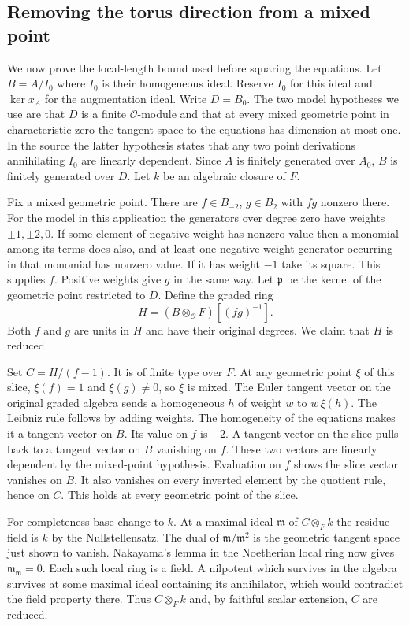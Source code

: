 \subsection{Removing the torus direction from a mixed point}

We now prove the local-length bound used before squaring the equations.
Let \(B=A/I_0\) where \(I_0\) is their homogeneous ideal. Reserve \(I_0\) for
this ideal and \(\ker x_A\) for the augmentation ideal. Write \(D=B_0\).
The two model hypotheses we use are that \(D\) is a finite
\(\mathcal O\)-module and that at every mixed geometric point in
characteristic zero the tangent space to the equations has dimension
at most one. In the source the latter hypothesis states that any
two point derivations annihilating \(I_0\) are linearly dependent.
Since \(A\) is finitely generated over \(A_0\), \(B\) is finitely
generated over \(D\). Let \(k\) be an algebraic closure of \(F\).

Fix a mixed geometric point. There are \(f\in B_{-2}\),
\(g\in B_2\) with \(fg\) nonzero there. For the model in this
application the generators over degree zero have weights
\(\pm1,\pm2,0\). If some element of negative weight has nonzero
value then a monomial among its terms does also, and at least one
negative-weight generator occurring in that monomial has nonzero
value. If it has weight \(-1\) take its square. This supplies \(f\). Positive weights give \(g\) in the same way. Let \(\mathfrak p\) be the kernel
of the geometric point restricted to \(D\). Define the graded ring
\[
     H=(B\otimes_{\mathcal O}F)[(fg)^{-1}] .
\]
Both \(f\) and \(g\) are units in \(H\) and have their original
degrees. We claim that \(H\) is reduced.

Set \(C=H/(f-1)\). It is of finite type over \(F\). At any geometric
point \(\xi\) of this slice, \(\xi(f)=1\) and \(\xi(g)\ne0\), so
\(\xi\) is mixed. The Euler tangent vector on the original graded
algebra sends a homogeneous \(h\) of weight \(w\) to
\(w\,\xi(h)\). The Leibniz rule follows by adding weights. The
homogeneity of the equations makes it a tangent vector on \(B\).
Its value on \(f\) is \(-2\). A tangent vector on the slice pulls
back to a tangent vector on \(B\) vanishing on \(f\). These
two vectors are linearly dependent by the mixed-point hypothesis.
Evaluation on \(f\) shows the slice vector vanishes on \(B\).
It also vanishes on every inverted element by the quotient rule,
hence on \(C\). This holds at every geometric point of the slice.

For completeness base change to \(k\). At a maximal ideal
\(\mathfrak m\) of \(C\otimes_F k\) the residue field is \(k\) by
the Nullstellensatz. The dual of \(\mathfrak m/\mathfrak m^2\) is
the geometric tangent space just shown to vanish. Nakayama's lemma
in the Noetherian local ring now gives \(\mathfrak m_{\mathfrak m}=0\).
Each such local ring is a field. A nilpotent which survives in the
algebra survives at some maximal ideal containing its annihilator,
which would contradict the field property there. Thus \(C\otimes_F k\)
and, by faithful scalar extension, \(C\) are reduced.

